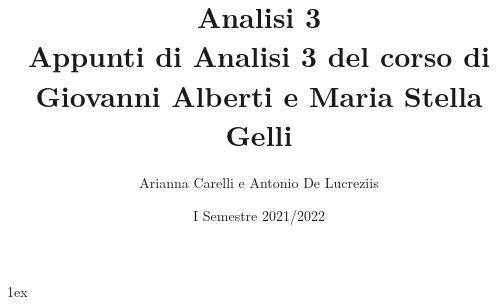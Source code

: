 \documentclass[a4paper, 12pt]{report}
\title{{\Huge Analisi 3}\\{\small Appunti di Analisi 3 del corso di Giovanni Alberti e Maria Stella Gelli}}
\author{Arianna Carelli e Antonio De Lucreziis}
\date{I Semestre 2021/2022}
\begin{document}
%
%
\parskip 1ex
\setlength{\parindent}{0pt}

\maketitle

\tableofcontents

\newpage








































\end{document}
